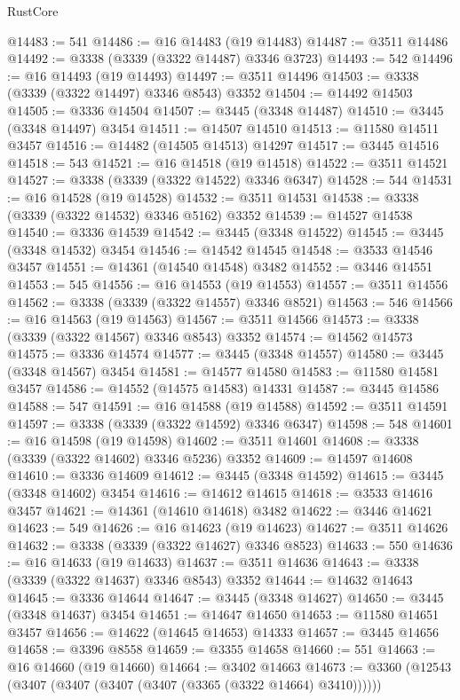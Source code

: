 \begin{lexlean}{RustCore}
\begin{coremodule}
@14483 := 541
@14486 := @16 @14483 (@19 @14483)
@14487 := @3511 @14486
@14492 := @3338 (@3339 (@3322 @14487) @3346 @3723)
@14493 := 542
@14496 := @16 @14493 (@19 @14493)
@14497 := @3511 @14496
@14503 := @3338 (@3339 (@3322 @14497) @3346 @8543) @3352
@14504 := @14492 @14503
@14505 := @3336 @14504
@14507 := @3445 (@3348 @14487)
@14510 := @3445 (@3348 @14497) @3454
@14511 := @14507 @14510
@14513 := @11580 @14511 @3457
@14516 := @14482 (@14505 @14513) @14297
@14517 := @3445 @14516
@14518 := 543
@14521 := @16 @14518 (@19 @14518)
@14522 := @3511 @14521
@14527 := @3338 (@3339 (@3322 @14522) @3346 @6347)
@14528 := 544
@14531 := @16 @14528 (@19 @14528)
@14532 := @3511 @14531
@14538 := @3338 (@3339 (@3322 @14532) @3346 @5162) @3352
@14539 := @14527 @14538
@14540 := @3336 @14539
@14542 := @3445 (@3348 @14522)
@14545 := @3445 (@3348 @14532) @3454
@14546 := @14542 @14545
@14548 := @3533 @14546 @3457
@14551 := @14361 (@14540 @14548) @3482
@14552 := @3446 @14551
@14553 := 545
@14556 := @16 @14553 (@19 @14553)
@14557 := @3511 @14556
@14562 := @3338 (@3339 (@3322 @14557) @3346 @8521)
@14563 := 546
@14566 := @16 @14563 (@19 @14563)
@14567 := @3511 @14566
@14573 := @3338 (@3339 (@3322 @14567) @3346 @8543) @3352
@14574 := @14562 @14573
@14575 := @3336 @14574
@14577 := @3445 (@3348 @14557)
@14580 := @3445 (@3348 @14567) @3454
@14581 := @14577 @14580
@14583 := @11580 @14581 @3457
@14586 := @14552 (@14575 @14583) @14331
@14587 := @3445 @14586
@14588 := 547
@14591 := @16 @14588 (@19 @14588)
@14592 := @3511 @14591
@14597 := @3338 (@3339 (@3322 @14592) @3346 @6347)
@14598 := 548
@14601 := @16 @14598 (@19 @14598)
@14602 := @3511 @14601
@14608 := @3338 (@3339 (@3322 @14602) @3346 @5236) @3352
@14609 := @14597 @14608
@14610 := @3336 @14609
@14612 := @3445 (@3348 @14592)
@14615 := @3445 (@3348 @14602) @3454
@14616 := @14612 @14615
@14618 := @3533 @14616 @3457
@14621 := @14361 (@14610 @14618) @3482
@14622 := @3446 @14621
@14623 := 549
@14626 := @16 @14623 (@19 @14623)
@14627 := @3511 @14626
@14632 := @3338 (@3339 (@3322 @14627) @3346 @8523)
@14633 := 550
@14636 := @16 @14633 (@19 @14633)
@14637 := @3511 @14636
@14643 := @3338 (@3339 (@3322 @14637) @3346 @8543) @3352
@14644 := @14632 @14643
@14645 := @3336 @14644
@14647 := @3445 (@3348 @14627)
@14650 := @3445 (@3348 @14637) @3454
@14651 := @14647 @14650
@14653 := @11580 @14651 @3457
@14656 := @14622 (@14645 @14653) @14333
@14657 := @3445 @14656
@14658 := @3396 @8558
@14659 := @3355 @14658
@14660 := 551
@14663 := @16 @14660 (@19 @14660)
@14664 := @3402 @14663
@14673 := @3360 (@12543 (@3407 (@3407 (@3407 (@3407 (@3365 (@3322 @14664) @3410))))))

\end{coremodule}
\end{lexlean}
